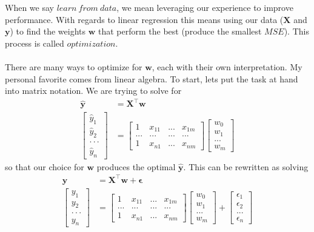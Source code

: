 \documentclass[a4paper]{article}
\begin{document}
\\ \\
\noindent When we say $learn\ from\ data$, we mean leveraging our experience to improve performance. With regards to linear regression this means using our data ($\bm{X}$ and $\bm{y}$) to find the weights $\bm{w}$ that perform the best (produce the smallest $MSE$). This process is called $optimization$. 
\\ \\
\noindent There are many ways to optimize for $\bm{w}$, each with their own interpretation. My personal favorite comes from linear algebra. To start, lets put the task at hand into matrix notation. We are trying to solve for
\begin{align*}
\hat{\bm{y}} &= \bm{X}^\intercal \bm{w} \\
\begin{bmatrix}
\hat{y}_1 \\
\hat{y}_2 \\
\cdot\cdot\cdot\\
\hat{y}_n 
\end{bmatrix} &=
\begin{bmatrix}
1 &x_{11}&...&x_{1m}\\
...& ... &... & ...\\
1 & x_{n1}& ...& x_{nm}
\end{bmatrix}
\begin{bmatrix}
w_0 \\
w_1 \\
... \\
w_m
\end{bmatrix}
\end{align*}
so that our choice for $\bm{w}$ produces the optimal $\bm{\hat{y}}$. This can be rewritten as solving 
\begin{align*}
\bm{y} &= \bm{X}^\intercal \bm{w} + \bm{\epsilon}\\
\begin{bmatrix}
y_1 \\
y_2 \\
\cdot\cdot\cdot\\
y_n
\end{bmatrix} &= 
\begin{bmatrix}
1 &x_{11}&...&x_{1m}\\
...& ... &... & ...\\
1 & x_{n1}& ...& x_{nm}
\end{bmatrix}
\begin{bmatrix}
w_0 \\
w_1 \\
... \\
w_m
\end{bmatrix}
+ \begin{bmatrix}
\epsilon_1 \\
\epsilon_2 \\
... \\
\epsilon_n
\end{bmatrix}
\end{align*}
\end{document}
